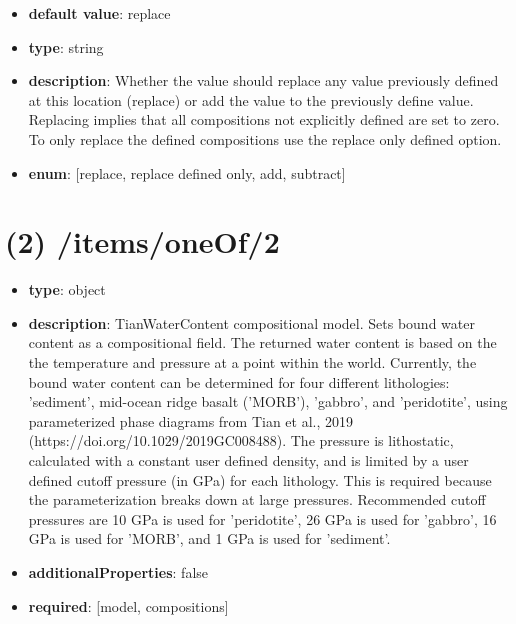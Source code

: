 \begin{itemize}[leftmargin=3em]\item {\bf default value}: replace
\item {\bf type}: string
\item {\bf description}: Whether the value should replace any value previously defined at this location (replace) or add the value to the previously define value. Replacing implies that all compositions not explicitly defined are set to zero. To only replace the defined compositions use the replace only defined option.
\item {\bf enum}: [replace, replace defined only, add, subtract]\end{itemize}\section{(2) /items/oneOf/2}
\begin{itemize}[leftmargin=2em]\item {\bf type}: object
\item {\bf description}: TianWaterContent compositional model. Sets bound water content as a compositional field. The returned water content is based on the the temperature and pressure at a point within the world. Currently, the bound water content can be determined for four different lithologies: 'sediment', mid-ocean ridge basalt ('MORB'), 'gabbro', and 'peridotite', using parameterized phase diagrams from Tian et al., 2019 (https://doi.org/10.1029/2019GC008488). The pressure is lithostatic, calculated with a constant user defined density, and is limited by a user defined cutoff pressure (in GPa) for each lithology. This is required because the parameterization breaks down at large pressures. Recommended cutoff pressures are 10 GPa is used for 'peridotite', 26 GPa is used for 'gabbro', 16 GPa is used for 'MORB', and 1 GPa is used for 'sediment'.
\item {\bf additionalProperties}: false
\item {\bf required}: [model, compositions]\end{itemize}
